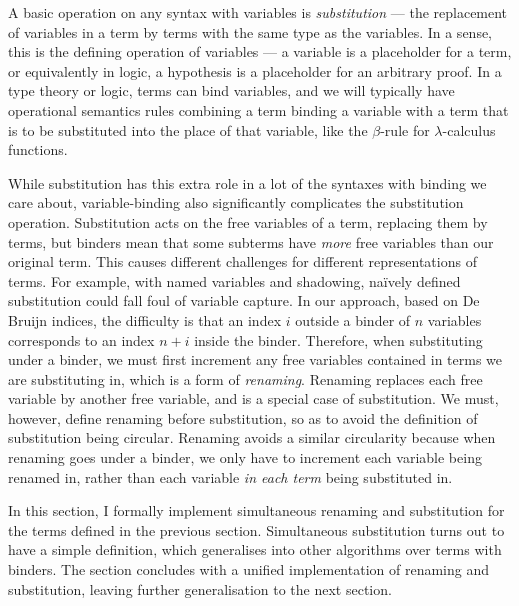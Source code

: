 \def\SimpleKits{../agda/processed-latex/SimpleKits.tex}

%

A basic operation on any syntax with variables is \emph{substitution} --- the
replacement of variables in a term by terms with the same type as the variables.
In a sense, this is the defining operation of variables --- a variable is a
placeholder for a term, or equivalently in logic, a hypothesis is a placeholder
for an arbitrary proof.
In a type theory or logic, terms can bind variables, and we will typically have
operational semantics rules combining a term binding a variable with a term that
is to be substituted into the place of that variable, like the $\beta$-rule for
$\lambda$-calculus functions.

While substitution has this extra role in a lot of the syntaxes with binding we
care about, variable-binding also significantly complicates the substitution
operation.
Substitution acts on the free variables of a term, replacing them by terms, but
binders mean that some subterms have \emph{more} free variables than our
original term.
This causes different challenges for different representations of terms.
For example, with named variables and shadowing, na\"{i}vely defined
substitution could fall foul of variable capture.
In our approach, based on De Bruijn indices, the difficulty is that an index $i$
outside a binder of $n$ variables corresponds to an index $n + i$ inside the
binder.
Therefore, when substituting under a binder, we must first increment any free
variables contained in terms we are substituting in, which is a form of
\emph{renaming}.
Renaming replaces each free variable by another free variable, and is a special
case of substitution.
We must, however, define renaming before substitution, so as to avoid the
definition of substitution being circular.
Renaming avoids a similar circularity because when renaming goes under a binder,
we only have to increment each variable being renamed in, rather than each
variable \emph{in each term} being substituted in.

In this section, I formally implement simultaneous renaming and substitution for
the terms defined in the previous section.
Simultaneous substitution turns out to have a simple definition, which
generalises into other algorithms over terms with binders.
The section concludes with a unified implementation of renaming and
substitution, leaving further generalisation to the next section.

